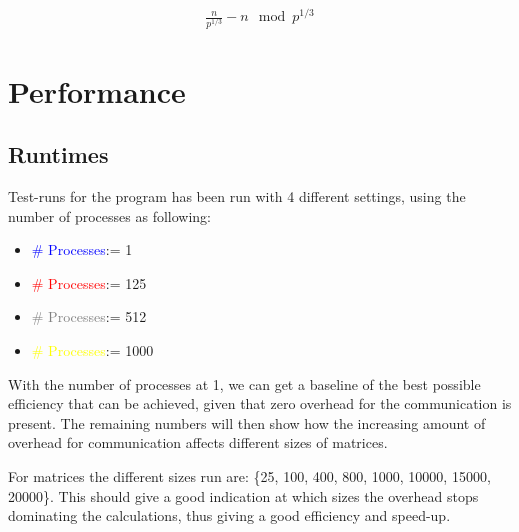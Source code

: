 \documentclass[a4paper,11pt,oneside]{book}
\begin{document}
\begin{align*}
    \frac{n}{p^{1/3}} - n \mod p^{1/3}
\end{align*}

\chapter{Performance}
\section{Runtimes}



Test-runs for the program has been run with 4 different settings, using the number of processes as following:
\begin{itemize}
\item[] \textcolor{blue}{\# Processes}:= 1
\item[] \textcolor{red}{\# Processes}:= 125
\item[] \textcolor{gray}{\# Processes}:= 512
\item[] \textcolor{yellow}{\# Processes}:= 1000
\end{itemize}

With the number of processes at 1, we can get a baseline of the best possible efficiency that can be achieved, given that zero overhead for the communication is present. The remaining numbers will then show how the increasing amount of overhead for communication affects different sizes of matrices.

For matrices the different sizes run are: \{25, 100, 400, 800, 1000, 10000, 15000, 20000\}. This should give a good indication at which sizes the overhead stops dominating the calculations, thus giving a good efficiency and speed-up.
\end{document}
